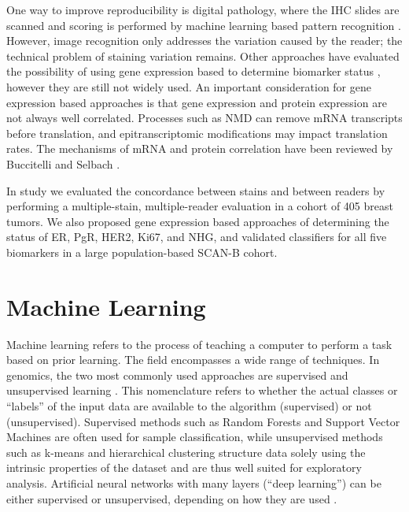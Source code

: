\documentclass[11pt]{book}
\newcommand{\scanb}{\mbox{SCAN-B}}
\begin{document}
One way to improve reproducibility is digital pathology, where the IHC slides are scanned and scoring is performed by machine learning based pattern recognition \cite{Rizzardi:2012, Mungle:2017, VanEycke:2017, Naik:2020}. However, image recognition only addresses the variation caused by the reader; the technical problem of staining variation remains. Other approaches have evaluated the possibility of using gene expression based to determine biomarker status \cite{Kun:2003, Gruvberger-Saal:2004, Roepman:2009, Bastani:2013, Wilson:2014, Viale:2014, Varga:2017}, however they are still not widely used. An important consideration for gene expression based approaches is that gene expression and protein expression are not always well correlated. Processes such as NMD can remove mRNA transcripts before translation, and epitranscriptomic modifications may impact translation rates. The mechanisms of mRNA and protein correlation have been reviewed by Buccitelli and Selbach \cite{BuccitelliSelbach:2020}.

In study \III we evaluated the concordance between stains and between readers by performing a multiple-stain, multiple-reader evaluation in a cohort of 405 breast tumors. We also proposed gene expression based approaches of determining the status of ER, PgR, HER2, Ki67, and NHG, and validated classifiers for all five biomarkers in a large population-based \scanb{} cohort.


\section{Machine Learning}
\label{sec:machine-learning}

Machine learning refers to the process of teaching a computer to perform a task based on prior learning. The field encompasses a wide range of techniques. In genomics, the two most commonly used approaches are supervised and unsupervised learning \cite{LibbrechtNoble:2015}. This nomenclature refers to whether the actual classes or ``labels'' of the input data are available to the algorithm (supervised) or not (unsupervised). Supervised methods such as Random Forests and Support Vector Machines are often used for sample classification, while unsupervised methods such as k-means and hierarchical clustering structure data solely using the intrinsic properties of the dataset and are thus well suited for exploratory analysis. Artificial neural networks with many layers (``deep learning'') can be either supervised or unsupervised, depending on how they are used \cite{Ching:2018}.
\end{document}
